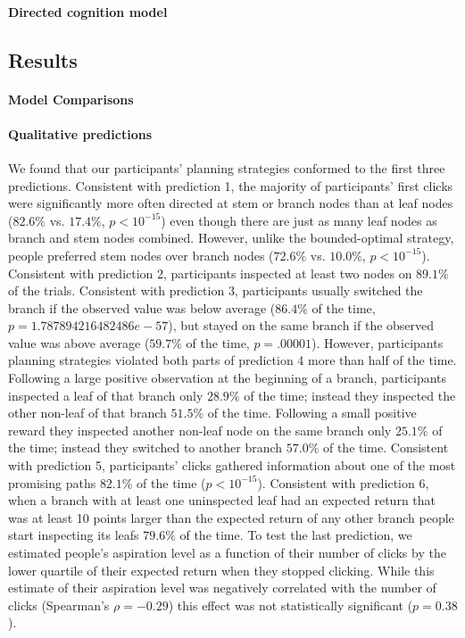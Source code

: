 \paragraph{Directed cognition model}


\subsection{Results}


\paragraph{Model Comparisons}



\paragraph{Qualitative predictions}
We found that our participants' planning strategies conformed to the first three predictions. Consistent with prediction 1, the majority of participants' first clicks were significantly more often directed at stem or branch nodes than at leaf nodes ($82.6\%$ vs. $17.4\%$, $p<10^{-15}$) even though there are just as many leaf nodes as branch and stem nodes combined. However, unlike the bounded-optimal strategy, people preferred stem nodes over branch nodes ($72.6\%$ vs. $10.0\%$, $p<10^{-15}$). Consistent with prediction 2, participants inspected at least two nodes on $89.1\%$ of the trials. Consistent with prediction 3, participants usually switched the branch if the observed value was below average ($86.4\%$ of the time, $p=1.787894216482486e-57$), but stayed on the same branch if the observed value was above average ($59.7\%$ of the time, $p=.00001$).
However, participants planning strategies violated both parts of prediction 4 more than half of the time. Following a large positive observation at the beginning of a branch, participants inspected a leaf of that branch only $28.9\%$ of the time; instead they inspected the other non-leaf of that branch $51.5\%$ of the time. Following a small positive reward they inspected another non-leaf node on the same branch only $25.1\%$ of the time; instead they switched to another branch $57.0\%$ of the time.
Consistent with prediction 5, participants' clicks gathered information about one of the most promising paths $82.1\%$ of the time ($p<10^{-15}$). Consistent with prediction 6, when a branch with at least one uninspected leaf had an expected return that was at least 10 points larger than the expected return of any other branch people start inspecting its leafs $79.6\%$ of the time.
To test the last prediction, we estimated people's aspiration level as a function of their number of clicks by the lower quartile of their expected return when they stopped clicking. While this estimate of their aspiration level was negatively correlated with the number of clicks (Spearman's $\rho=-0.29$) this effect was not statistically significant ($p=0.38$).

